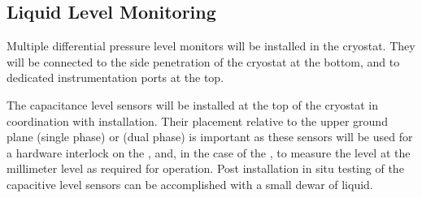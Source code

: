 \subsection{Liquid Level Monitoring}
\label{sec:fdgen-slow-cryo-install-llm}

% 
% 

Multiple differential pressure level monitors will be installed in the
cryostat.  They will be connected to the side
penetration of the cryostat at the bottom, and to dedicated
instrumentation ports at the top.

The capacitance level sensors will be installed at the top of the
cryostat in coordination with  installation.  Their
placement relative to the upper ground plane (single phase) or
 (dual phase) is important as these sensors will be used for a
hardware interlock on the , and, in the case of the \dual, to measure the \lar level at the millimeter level as required
for \dual operation.
Post installation in situ testing of the capacitive level sensors can be
accomplished with a small dewar of liquid.


